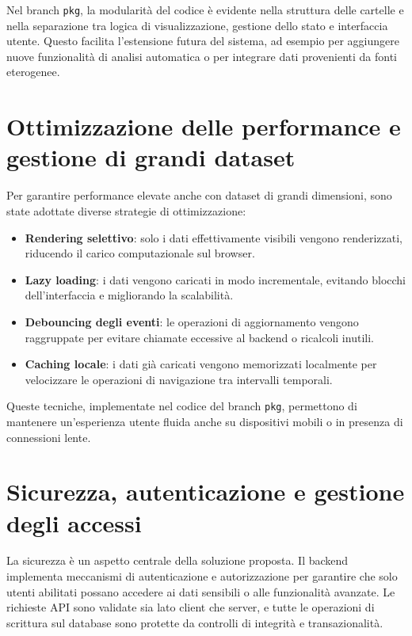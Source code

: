 Nel branch \texttt{pkg}, la modularità del codice è evidente nella struttura delle cartelle e nella separazione tra logica di visualizzazione, gestione dello stato e interfaccia utente. Questo facilita l’estensione futura del sistema, ad esempio per aggiungere nuove funzionalità di analisi automatica o per integrare dati provenienti da fonti eterogenee.

\section{Ottimizzazione delle performance e gestione di grandi dataset}

Per garantire performance elevate anche con dataset di grandi dimensioni, sono state adottate diverse strategie di ottimizzazione:

\begin{itemize}
    \item \textbf{Rendering selettivo}: solo i dati effettivamente visibili vengono renderizzati, riducendo il carico computazionale sul browser.
    \item \textbf{Lazy loading}: i dati vengono caricati in modo incrementale, evitando blocchi dell’interfaccia e migliorando la scalabilità.
    \item \textbf{Debouncing degli eventi}: le operazioni di aggiornamento vengono raggruppate per evitare chiamate eccessive al backend o ricalcoli inutili.
    \item \textbf{Caching locale}: i dati già caricati vengono memorizzati localmente per velocizzare le operazioni di navigazione tra intervalli temporali.
\end{itemize}

Queste tecniche, implementate nel codice del branch \texttt{pkg}, permettono di mantenere un’esperienza utente fluida anche su dispositivi mobili o in presenza di connessioni lente.

\section{Sicurezza, autenticazione e gestione degli accessi}

La sicurezza è un aspetto centrale della soluzione proposta. Il backend implementa meccanismi di autenticazione e autorizzazione per garantire che solo utenti abilitati possano accedere ai dati sensibili o alle funzionalità avanzate. Le richieste API sono validate sia lato client che server, e tutte le operazioni di scrittura sul database sono protette da controlli di integrità e transazionalità.

